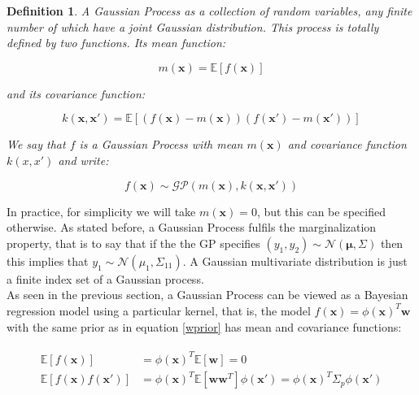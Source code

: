 \documentclass[10pt,a4paper,twoside]{book}
\newtheorem{defini}{Definition}
\begin{document}
\begin{defini}
A Gaussian Process as a collection of random variables, any finite number of which have a joint Gaussian distribution. This process is totally defined by two functions. Its \textit{mean function}:

\begin{equation}
m(\boldsymbol{x}) = \mathbb{E}\left[f(\boldsymbol{x})\right]
\end{equation} 

and its \textit{covariance function}:

\begin{equation}
k(\boldsymbol{x}, \boldsymbol{x'}) = \mathbb{E}\left[\left( f(\boldsymbol{x}) - m(\boldsymbol{x}) \right)\left( f(\boldsymbol{x}') - m(\boldsymbol{x}')\right)\right]
\end{equation}


We say that $f$ is a Gaussian Process with mean $m(\boldsymbol{x})$ and covariance function $k(x, x')$ and write:

\begin{equation}
f(\boldsymbol{x}) \sim \mathcal{GP}\left(m(\boldsymbol{x}), k(\boldsymbol{x}, \boldsymbol{x'}) \right)
\end{equation}
\end{defini}

In practice, for simplicity we will take $m(\boldsymbol{x}) = 0$, but this can be specified otherwise. As stated before, a Gaussian Process fulfils the marginalization property, that is to say that if the the GP specifies $(y_1, y_2) \sim \mathcal{N}(\boldsymbol{\mu}, \Sigma)$ then this implies that $y_1 \sim \mathcal{N}(\mu_1, \Sigma_{11})$. A Gaussian multivariate distribution is just a finite index set of a Gaussian process. \\

As seen in the previous section, a Gaussian Process can be viewed as a Bayesian regression model using a particular kernel, that is, the model $f(\boldsymbol{x}) = \phi(\boldsymbol{x})^T \boldsymbol{w}$ with the same prior as in equation \ref{wprior} has mean and covariance functions:

\begin{align}
\begin{split}
\mathbb{E}\left[f(\boldsymbol{x})\right] &= \phi(\boldsymbol{x})^T\mathbb{E}\left[\boldsymbol{w}\right] = 0\\
\mathbb{E}\left[f(\boldsymbol{x})f(\boldsymbol{x'})\right] &= \phi(\boldsymbol{x})^T\mathbb{E}\left[\boldsymbol{w}\boldsymbol{w}^T\right]
\phi(\boldsymbol{x'}) = \phi(\boldsymbol{x})^T\Sigma_p\phi(\boldsymbol{x'})
\end{split}
\end{align}
\end{document}
